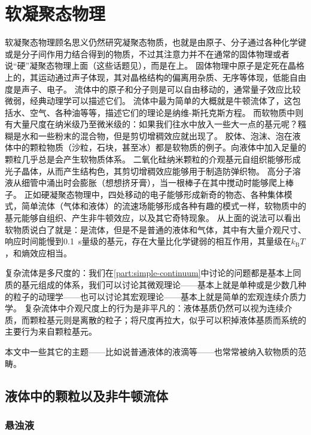 \part{软凝聚态物理}

软凝聚态物理顾名思义仍然研究凝聚态物质，也就是由原子、分子通过各种化学键或是分子间作用力结合得到的物质，不过其注意力并不在通常的固体物理或者说“硬”凝聚态物理上面（这些话题见\soliddoc），而是在上。
固体物理中原子是定死在晶格上的，其运动通过声子体现，其对晶格结构的偏离用杂质、无序等体现，低能自由度是声子、电子。
流体中的原子和分子则是可以自由移动的，通常量子效应比较微弱，经典动理学可以描述它们。
流体中最为简单的大概就是牛顿流体了，这包括水、空气、各种油等等，描述它们的理论是纳维-斯托克斯方程。
而软物质中则有大量尺度在纳米级乃至微米级的：如果我们往水中放入一些大一点的基元呢？糨糊是水和一些粉末的混合物，但是剪切增稠效应就出现了。
胶体、泡沫、泡在液体中的颗粒物质（沙粒，石块，甚至冰）都是软物质的例子。向液体中加入足量的颗粒几乎总是会产生软物质体系。
二氧化硅纳米颗粒的介观基元自组织能够形成光子晶体，从而产生结构色，其剪切增稠效应能够用于制造防弹织物。
高分子溶液从细管中涌出时会膨胀（想想挤牙膏），当一根棒子在其中搅动时能够爬上棒子。
正如硬凝聚态物理中，四处移动的电子能够形成新奇的物态、各种集体模式，简单流体（气体和液体）的流速场能够形成各种有趣的模式一样，软物质中的基元能够自组织、产生非牛顿效应，以及其它奇特现象。
从上面的说法可以看出软物质说白了就是：是流体，但是不是普通的液体和气体，其中有大量介观尺寸、响应时间能慢到\SI{0.1}{s}量级的基元，存在大量比化学键弱的相互作用，其量级在$k_\text{B} T$，和熵效应相当。

复杂流体是多尺度的：我们在\autoref{part:simple-continuum}中讨论的问题都是基本上同质的基元组成的体系，我们可以讨论其微观理论——基本上就是单种或是少数几种的粒子的动理学——也可以讨论其宏观理论——基本上就是简单的宏观连续介质力学。
复杂流体中介观尺度上的行为是非平凡的：液体基质仍然可以视为连续介质，而颗粒基元则是离散的粒子；将尺度再拉大，似乎可以积掉液体基质而系统的主要行为来自颗粒基元。

本文中一些其它的主题——比如说普通液体的液滴等——也常常被纳入软物质的范畴。

\chapter{液体中的颗粒以及非牛顿流体}\label{chap:non-newtonian}

\section{悬浊液}

